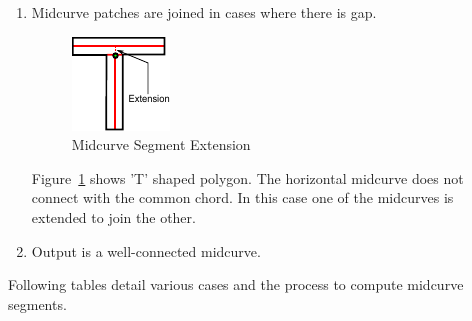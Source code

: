 \begin{enumerate} [noitemsep,topsep=2pt,parsep=2pt,partopsep=2pt]

Figure~\ref{fig_polymid} shows midcurve segment computed for one of the cells. In shapes like 'L' midcurves from both sub-polygons, across the chord, join together at a vertex, naturally. Additional extensions are not required.

\item Midcurve patches are joined in cases where there is gap.


\begin{figure}[h]
\centering \includegraphics[width=0.25\linewidth]{../Common/images/midcurve_extend_2.pdf} 
\caption{Midcurve Segment Extension}
\label{fig_extend}
\end{figure}


Figure~\ref{fig_extend} shows  'T' shaped polygon. The horizontal midcurve does not connect with the common chord. In this case one of the midcurves is extended to join the other. 

\item Output is a well-connected midcurve.
\end{enumerate}

Following tables detail various cases and the process to compute midcurve segments.

\def\trianglecasestablewidth{0.45}

\bigskip

